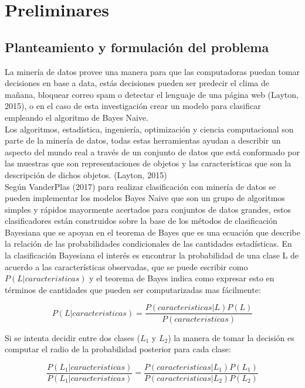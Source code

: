 \chapter{Preliminares}

\section{Planteamiento y formulaci\'on del problema}

La minería de datos provee una manera para que las computadoras puedan tomar decisiones en base a data, estás decisiones pueden ser predecir el clima de mañana, bloquear correo spam o detectar el lenguaje de una página web (Layton, 2015), o en el caso de esta investigación crear un modelo para clasificar empleando el algoritmo de Bayes Naive.\\

Los algoritmos, estadística, ingeniería, optimización y ciencia computacional son parte de la minería de datos, todas estas herramientas ayudan a describir un aspecto del mundo real a través de un conjunto de datos que está conformado por las muestras que son representaciones de objetos y las características que son la descripción de dichos objetos. (Layton, 2015)\\

Según VanderPlas (2017) para realizar clasificación con minería de datos se pueden implementar los modelos Bayes Naive que son un grupo de algoritmos simples y rápidos mayormente acertados para conjuntos de datos grandes, estos clasificadores están construidos sobre la base de los métodos de clasificación Bayesiana que se apoyan en el teorema de Bayes que es una ecuación que describe la relación de las probabilidades condicionales de las cantidades estadísticas. En la clasificación Bayesiana el interés es encontrar la probabilidad de una clase L de acuerdo a las características observadas, que se puede escribir como $P\left(L|caracteristicas\right)$ y el teorema de Bayes indica como expresar esto en términos de cantidades que pueden ser computarizadas mas fácilmente:

\[P\left(L|caracteristicas\right)=\frac{P\left(caracteristicas|L\right)P\left(L\right)}{P\left(caracteristicas\right)}\]
  
Si se intenta decidir entre dos clases ($L_{1}$ y $L_{2}$) la manera de tomar la decisión es computar el radio de la probabilidad posterior para cada clase:

\[\frac{P\left(L_{1}|caracteristicas\right)}{P\left(L_{1}|caracteristicas\right)}=\frac{P\left(caracteristicas|L_{1}\right)P\left(L_{1}\right)}{P\left(caracteristicas|L_{2}\right)P\left(L_{2}\right)}\]\\

